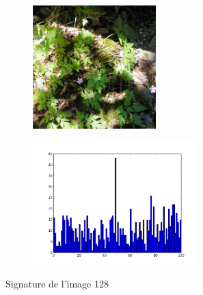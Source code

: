 \documentclass[12pt]{article}
\begin{document}
\begin{figure}[h]
        \centering
        \begin{subfigure}[b]{0.5\textwidth}
                \centering
                \includegraphics[height=180px]{128.jpg}
        \end{subfigure}%
        \hfill
        \begin{subfigure}[b]{0.5\textwidth}
                \centering
                \includegraphics[height=180px]{128_sig.png}
        \end{subfigure}
        \caption{Signature de l'image 128}
        \label{fig:signature1}
\end{figure}
\end{document}
